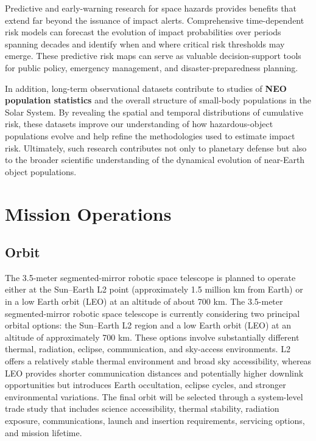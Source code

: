 Predictive and early-warning research for space hazards provides benefits that extend far beyond the issuance of impact alerts. Comprehensive time-dependent risk models can forecast the evolution of impact probabilities over periods spanning decades and identify when and where critical risk thresholds may emerge. These predictive risk maps can serve as valuable decision-support tools for public policy, emergency management, and disaster-preparedness planning.

In addition, long-term observational datasets contribute to studies of \textbf{NEO population statistics} and the overall structure of small-body populations in the Solar System. By revealing the spatial and temporal distributions of cumulative risk, these datasets improve our understanding of how hazardous-object populations evolve and help refine the methodologies used to estimate impact risk. Ultimately, such research contributes not only to planetary defense but also to the broader scientific understanding of the dynamical evolution of near-Earth object populations.

\chapter{Mission Operations}\label{mission-operations}
\vspace{4mm}

\section{Orbit}\label{orbit}

The 3.5-meter segmented-mirror robotic space telescope is planned to operate either at the Sun--Earth L2 point (approximately 1.5 million km from Earth) or in a low Earth orbit (LEO) at an altitude of about 700 km. The 3.5-meter segmented-mirror robotic space telescope is currently considering two principal orbital options: the Sun--Earth L2 region and a low Earth orbit (LEO) at an altitude of approximately 700 km. These options involve substantially different thermal, radiation, eclipse, communication, and sky-access environments. L2 offers a relatively stable thermal environment and broad sky accessibility, whereas LEO provides shorter communication distances and potentially higher downlink opportunities but introduces Earth occultation, eclipse cycles, and stronger environmental variations. The final orbit will be selected through a system-level trade study that includes science accessibility, thermal stability, radiation exposure, communications, launch and insertion requirements, servicing options, and mission lifetime.


